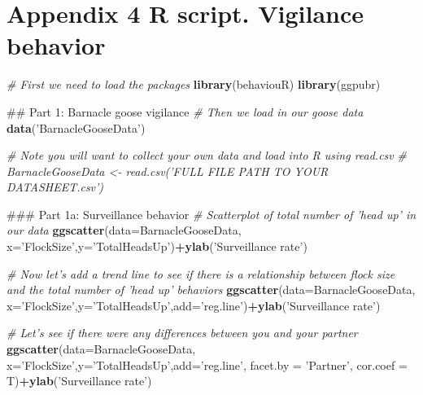 \documentclass[]{book}
\newenvironment{Shaded}{\begin{snugshade}}{\end{snugshade}}
\newcommand{\CommentTok}[1]{\textcolor[rgb]{0.56,0.35,0.01}{\textit{#1}}}
\newcommand{\DataTypeTok}[1]{\textcolor[rgb]{0.13,0.29,0.53}{#1}}
\newcommand{\KeywordTok}[1]{\textcolor[rgb]{0.13,0.29,0.53}{\textbf{#1}}}
\newcommand{\NormalTok}[1]{#1}
\newcommand{\OperatorTok}[1]{\textcolor[rgb]{0.81,0.36,0.00}{\textbf{#1}}}
\newcommand{\StringTok}[1]{\textcolor[rgb]{0.31,0.60,0.02}{#1}}
\begin{document}
\hypertarget{appendix-4-r-script.-vigilance-behavior}{%
\chapter*{Appendix 4 R script. Vigilance behavior}\label{appendix-4-r-script.-vigilance-behavior}}

\begin{Shaded}
\begin{Highlighting}[]
\CommentTok{# First we need to load the packages}
\KeywordTok{library}\NormalTok{(behaviouR)}
\KeywordTok{library}\NormalTok{(ggpubr)}

\NormalTok{## Part 1: Barnacle goose vigilance}
\CommentTok{# Then we load in our goose data}
\KeywordTok{data}\NormalTok{(}\StringTok{'BarnacleGooseData'}\NormalTok{)}

\CommentTok{# Note you will want to collect your own data and load into R using read.csv }
\CommentTok{# BarnacleGooseData <- read.csv('FULL FILE PATH TO YOUR DATASHEET.csv')}

\NormalTok{### Part 1a: Surveillance behavior}
\CommentTok{# Scatterplot of total number of 'head up' in our data}
\KeywordTok{ggscatter}\NormalTok{(}\DataTypeTok{data=}\NormalTok{BarnacleGooseData,}
          \DataTypeTok{x=}\StringTok{'FlockSize'}\NormalTok{,}\DataTypeTok{y=}\StringTok{'TotalHeadsUp'}\NormalTok{)}\OperatorTok{+}\KeywordTok{ylab}\NormalTok{(}\StringTok{'Surveillance rate'}\NormalTok{)}

\CommentTok{# Now let's add a trend line to see if there is a relationship between flock size and the total number of 'head up' behaviors}
\KeywordTok{ggscatter}\NormalTok{(}\DataTypeTok{data=}\NormalTok{BarnacleGooseData,}
          \DataTypeTok{x=}\StringTok{'FlockSize'}\NormalTok{,}\DataTypeTok{y=}\StringTok{'TotalHeadsUp'}\NormalTok{,}\DataTypeTok{add=}\StringTok{'reg.line'}\NormalTok{)}\OperatorTok{+}\KeywordTok{ylab}\NormalTok{(}\StringTok{'Surveillance rate'}\NormalTok{)}

\CommentTok{# Let's see if there were any differences between you and your partner}
\KeywordTok{ggscatter}\NormalTok{(}\DataTypeTok{data=}\NormalTok{BarnacleGooseData,}
          \DataTypeTok{x=}\StringTok{'FlockSize'}\NormalTok{,}\DataTypeTok{y=}\StringTok{'TotalHeadsUp'}\NormalTok{,}\DataTypeTok{add=}\StringTok{'reg.line'}\NormalTok{, }\DataTypeTok{facet.by =} \StringTok{'Partner'}\NormalTok{,}
          \DataTypeTok{cor.coef =}\NormalTok{ T)}\OperatorTok{+}\KeywordTok{ylab}\NormalTok{(}\StringTok{'Surveillance rate'}\NormalTok{)}


\end{Highlighting}
\end{Shaded}
\end{document}
